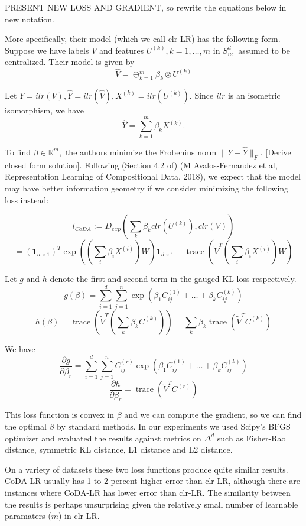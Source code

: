 \documentclass[BSc]{usydthesis}
\numberwithin{equation}{chapter}
\theoremstyle{remark}
\begin{document}
PRESENT NEW LOSS AND GRADIENT, so rewrite the equations below in new notation.

More specifically, their model (which we call clr-LR) has the following form. Suppose we have labels $V$ and features $U^{(k)}, k=1,\ldots, m$ in $S^d_n,$ assumed to be centralized. Their model is given by $$ \hat{V} = \oplus_{k=1}^m \beta_k \otimes U^{(k)} $$

Let $Y = ilr(V), \hat{Y} = ilr(\hat{V}), X^{(k)} = ilr( U^{(k)} ).$  Since $ilr$ is an isometric isomorphism, we have $$ \hat{Y} = \sum_{k=1}^m \beta_k X^{(k)}.$$

To find $\beta \in \mathbb{R}^m,$ the authors minimize the Frobenius norm $ \| Y - \hat{Y} \|_F.$ [Derive closed form solution]. Following (Section 4.2 of) (M Avalos-Fernandez et al,  Representation Learning of Compositional Data, 2018), we expect that the model may have better information geometry if we consider minimizing the following loss instead:

$$ l_{CoDA} := D_{exp} \left( \sum_k \beta_k clr(U^{(k)} ), clr(V) \right)$$
$$ = (\mathbf{1}_{n \times 1})^T \exp \left( (\sum_i \beta_i X^{(i)})W \right) \mathbf{1}_{d\times 1} - \operatorname{trace}(\tilde{V}^T (\sum_i \beta_i X^{(i)})W )$$

Let $g$ and $h$ denote the first and second term in the gauged-KL-loss respectively. 
$$ g(\beta) = \sum_{i=1}^d \sum_{j=1}^n \exp \left( \beta_1 C^{(1)}_{ij} + \ldots + \beta_k C^{(k)}_{ij} \right)$$
$$ h(\beta) = \operatorname{trace}\left( \tilde{V}^T \left( \sum_k \beta_k C^{(k)} \right)  \right) = \sum_k \beta_k \operatorname{trace}\left( \tilde{V}^T C^{(k)} \right) $$

We have $$ \frac{ \partial g}{\partial \beta_r } = \sum_{i=1}^d \sum_{j=1}^n C^{(r)}_{ij} \exp \left( \beta_1 C^{(1)}_{ij} + \ldots + \beta_k C^{(k)}_{ij} \right)$$
$$ \frac{ \partial h}{\partial \beta_r } = \operatorname{trace}\left( \tilde{V}^T C^{(r)}\right)$$

This loss function is convex in $\beta$ and we can compute the gradient, so we can find the optimal $\beta$ by standard methods. In our experiments we used Scipy's BFGS optimizer and evaluated the results against metrics on $\Delta^d$ such as Fisher-Rao distance, symmetric KL distance, L1 distance and L2 distance.

On a variety of datasets these two loss functions produce quite similar results. CoDA-LR usually has 1 to 2 percent higher error than clr-LR, although there are instances where CoDA-LR has lower error than clr-LR. The similarity between the results is perhaps unsurprising given the relatively small number of learnable paramaters ($m$) in clr-LR. 
\end{document}
